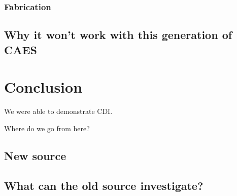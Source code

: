 \subsection{Fabrication}

\section{Why it won't work with this generation of CAES}



\chapter{Conclusion}

We were able to demonstrate CDI.

Where do we go from here?

\section{New source}

\section{What can the old source investigate?}


